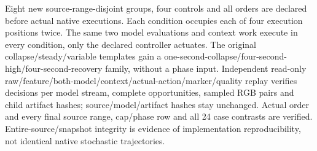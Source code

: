\documentclass[10pt]{article}
\begin{document}
Eight new source-range-disjoint groups, four controls and all orders are declared before \NativeContextPeers{} actual native executions. Each condition occupies each of four execution positions twice. The same two model evaluations and context work execute in every condition, only the declared controller actuates. The original collapse/steady/variable templates gain a one-second-collapse/four-second-high/four-second-recovery family, without a phase input. Independent read-only raw/feature/both-model/context/actual-action/marker/quality replay verifies \NativeContextDecisions{} decisions per model stream, \NativeContextRequests{} complete opportunities, \NativeContextPairs{} sampled RGB pairs and \NativeContextChildHashes{} child artifact hashes; \NativeContextProofHashes{} source/model/artifact hashes stay unchanged. Actual order and every final source range, cap/phase row and all 24 case contrasts are verified. Entire-source/snapshot integrity is evidence of implementation reproducibility, not identical native stochastic trajectories.
\begin{table}[ht]
\centering
\caption{Actual native causal-context development means on eight fresh synthetic source groups; frozen actors and unchanged risk screens. No native promotion or published-learned-peer comparison.}
\label{tab:native-context-v5}
\end{table}
\begin{table}[ht]
\centering\resizebox{\textwidth}{!}{}
\caption{Every context-minus-fixed-control family mean, two source groups per family; both positive and negative utility/on-time changes are retained.}
\label{tab:native-context-v5-groups}
\end{table}
\begin{table}[ht]
\centering\resizebox{\textwidth}{!}{}
\caption{All 24 actual context-minus-control case contrasts, including unfavorable steady, brief-collapse and catastrophic variable/collapse cases. These are descriptive one-seed development outcomes, not paired identical packet traces or confidence intervals.}
\label{tab:native-context-v5-cases}
\end{table}
\end{document}
